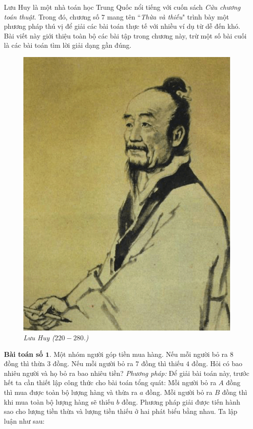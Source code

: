 \begin{multicols}{2}
	Lưu Huy là một nhà toán học Trung Quốc nổi tiếng với cuốn sách \textit{Cửu chương toán thuật}. Trong đó, chương số $7$ mang tên ``\textit{Thừa và thiếu}" trình bày một phương pháp thú vị để giải các bài toán thực tế với nhiều ví dụ từ dễ đến khó. Bài viết này giới thiệu toàn bộ các bài tập trong chương này, trừ một số bài cuối là các bài toán tìm lời giải dạng gần đúng.
	\begin{figure}[H]
		\vspace*{-5pt}
		\centering
		\captionsetup{labelformat= empty, justification=centering}
		\includegraphics[width= 0.7\linewidth]{1}
		\caption{\small\textit{\color{diendantoanhoc}Lưu Huy ($220-280$.)}}
		\vspace*{-10pt}
	\end{figure}
	\textbf{\color{diendantoanhoc}Bài toán số $\pmb{1.}$} Một nhóm người góp tiền mua hàng. Nếu mỗi người bỏ ra $8$ đồng thì thừa $3$ đồng. Nếu mỗi người bỏ ra $7$ đồng thì thiếu $4$ đồng. Hỏi có bao nhiêu người và họ bỏ ra bao nhiêu tiền?
	\vskip 0.1cm
	\textit{Phương pháp:} Để giải bài toán này, trước hết ta cần thiết lập công thức cho bài toán tổng quát:
	\vskip 0.1cm
	Mỗi người bỏ ra $A$ đồng thì mua được toàn bộ lượng hàng và thừa ra $a$ đồng.
	\vskip 0.1cm
	Mỗi người bỏ ra $B$ đồng thì khi mua toàn bộ lượng hàng sẽ thiếu $b$ đồng.
	\vskip 0.1cm
	Phương pháp giải được tiến hành sao cho lượng tiền thừa và lượng tiền thiếu ở hai phát biểu bằng nhau. Ta lập luận như sau:

\end{multicols}
